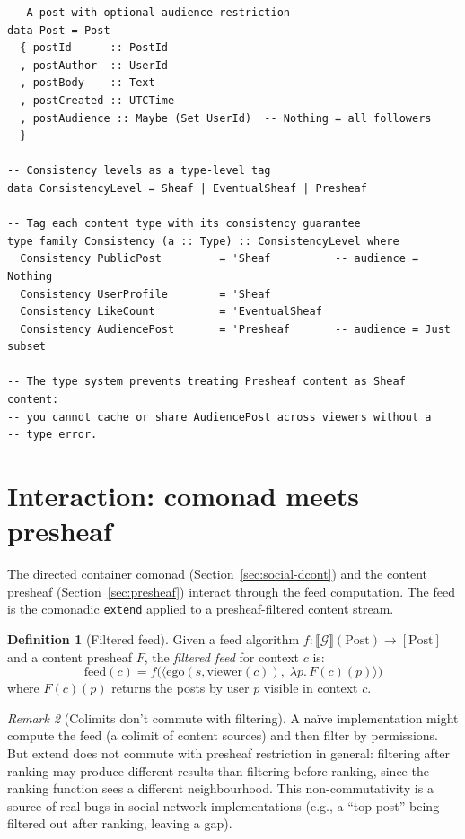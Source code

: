 \documentclass[11pt,a4paper]{article}
\theoremstyle{definition}
\newtheorem{definition}{Definition}[section]
\theoremstyle{plain}
\theoremstyle{remark}
\newtheorem{remark}[definition]{Remark}
\newcommand{\viewer}{\mathrm{viewer}}
\newcommand{\ego}{\mathrm{ego}}
\begin{document}
\begin{lstlisting}[style=haskell]
-- A post with optional audience restriction
data Post = Post
  { postId      :: PostId
  , postAuthor  :: UserId
  , postBody    :: Text
  , postCreated :: UTCTime
  , postAudience :: Maybe (Set UserId)  -- Nothing = all followers
  }

-- Consistency levels as a type-level tag
data ConsistencyLevel = Sheaf | EventualSheaf | Presheaf

-- Tag each content type with its consistency guarantee
type family Consistency (a :: Type) :: ConsistencyLevel where
  Consistency PublicPost         = 'Sheaf          -- audience = Nothing
  Consistency UserProfile        = 'Sheaf
  Consistency LikeCount          = 'EventualSheaf
  Consistency AudiencePost       = 'Presheaf       -- audience = Just subset

-- The type system prevents treating Presheaf content as Sheaf content:
-- you cannot cache or share AudiencePost across viewers without a
-- type error.
\end{lstlisting}

\section{Interaction: comonad meets presheaf}
\label{sec:interaction}

The directed container comonad (Section~\ref{sec:social-dcont}) and the
content presheaf (Section~\ref{sec:presheaf}) interact through the
feed computation. The feed is the comonadic \texttt{extend} applied to
a presheaf-filtered content stream.

\begin{definition}[Filtered feed]
Given a feed algorithm $f : \llbracket \mathcal{G} \rrbracket(\mathrm{Post}) \to [\mathrm{Post}]$
and a content presheaf $F$, the \emph{filtered feed} for context $c$ is:
\[
  \mathrm{feed}(c) = f\bigl(\langle \ego(s, \viewer(c)),\; \lambda p.\, F(c)(p) \rangle\bigr)
\]
where $F(c)(p)$ returns the posts by user $p$ visible in context $c$.
\end{definition}

\begin{remark}[Colimits don't commute with filtering]
A na\"ive implementation might compute the feed (a colimit of
content sources) and then filter by permissions. But $\mathrm{extend}$
does not commute with presheaf restriction in general: filtering
after ranking may produce different results than filtering before
ranking, since the ranking function sees a different neighbourhood.
This non-commutativity is a source of real bugs in social network
implementations (e.g., a ``top post'' being filtered out after ranking,
leaving a gap).
\end{remark}
\end{document}
